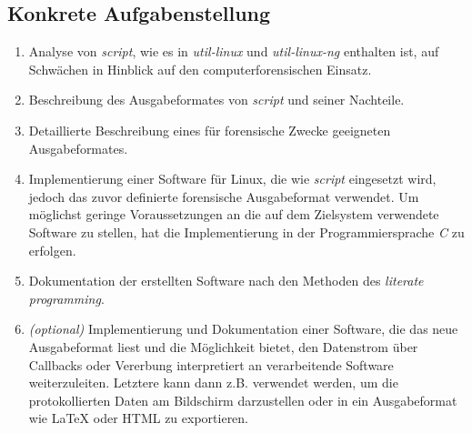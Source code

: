 \subsection*{Konkrete Aufgabenstellung}
\begin{enumerate}
\item Analyse von \emph{script}, wie es in \emph{util-linux} und \emph{util-linux-ng} enthalten ist, auf Schwächen in Hinblick auf den computerforensischen Einsatz.
\item Beschreibung des Ausgabeformates von \emph{script} und seiner Nachteile.
\item Detaillierte Beschreibung eines für forensische Zwecke geeigneten Ausgabeformates.
\item Implementierung einer Software für Linux, die wie \emph{script} eingesetzt wird, jedoch das zuvor definierte forensische Ausgabeformat verwendet. Um möglichst geringe Voraussetzungen an die auf dem Zielsystem verwendete Software zu stellen, hat die Implementierung in der Programmiersprache \emph{C} zu erfolgen.
\item Dokumentation der erstellten Software nach den Methoden des \emph{literate programming}.
\item \emph{(optional)} Implementierung und Dokumentation einer Software, die das neue Ausgabeformat liest und die Möglichkeit bietet, den Datenstrom über Callbacks oder Vererbung interpretiert an verarbeitende Software weiterzuleiten. Letztere kann dann z.B. verwendet werden, um die protokollierten Daten am Bildschirm darzustellen oder in ein Ausgabeformat wie \LaTeX{} oder HTML zu exportieren.
\end{enumerate}


